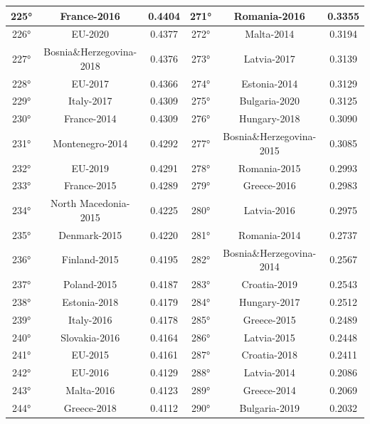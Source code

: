 \documentclass[a4paper,12pt, openright]{report}
\begin{document}
\begin{longtable}[c]{|c|c|c|c|c|c|}
    \hline
    225° &  France-2016 & 0.4404 & 271° & Romania-2016 & 0.3355 \\ 
    \hline
    226° &  EU-2020 & 0.4377 & 272° &  Malta-2014 & 0.3194 \\
    \hline
    227° & Bosnia\&Herzegovina-2018 & 0.4376 &  273° &  Latvia-2017 & 0.3139 \\ 
    \hline
    228° & EU-2017 & 0.4366  & 274°&  Estonia-2014 & 0.3129 \\ 
    \hline
    229° & Italy-2017 & 0.4309 & 275° &  Bulgaria-2020 &  0.3125 \\ 
    \hline
    230° &  France-2014 & 0.4309 & 276° &  Hungary-2018 & 0.3090 \\
    \hline
    231° & Montenegro-2014 & 0.4292 & 277° &  Bosnia\&Herzegovina-2015 & 0.3085 \\ 
    \hline
    232° &  EU-2019 & 0.4291 & 278° &  Romania-2015 & 0.2993 \\
    \hline
    233° &  France-2015 & 0.4289 & 279° &  Greece-2016 & 0.2983 \\
    \hline
    234° & North Macedonia-2015 & 0.4225 & 280° &  Latvia-2016 & 0.2975\\
    \hline
    235° &  Denmark-2015 & 0.4220 & 281° &  Romania-2014 & 0.2737 \\
    \hline
    236° &  Finland-2015 & 0.4195 & 282° &  Bosnia\&Herzegovina-2014 & 0.2567 \\
    \hline
    237° &  Poland-2015 & 0.4187 & 283° &  Croatia-2019 & 0.2543 \\
    \hline
    238° &  Estonia-2018 & 0.4179 & 284° &  Hungary-2017 & 0.2512 \\
    \hline
    239° &  Italy-2016 & 0.4178 & 285° &  Greece-2015 & 0.2489 \\
    \hline
    240° & Slovakia-2016 & 0.4164 & 286° &  Latvia-2015 & 0.2448 \\
    \hline
    241° & EU-2015 & 0.4161 & 287° &  Croatia-2018 & 0.2411 \\
    \hline
    242° &  EU-2016 & 0.4129 & 288° &  Latvia-2014 & 0.2086 \\
    \hline
    243° &  Malta-2016 & 0.4123 & 289° &  Greece-2014 & 0.2069\\
    \hline
    244° &  Greece-2018 & 0.4112 & 290° &  Bulgaria-2019 & 0.2032 \\
    \hline
\end{longtable}
\end{document}
